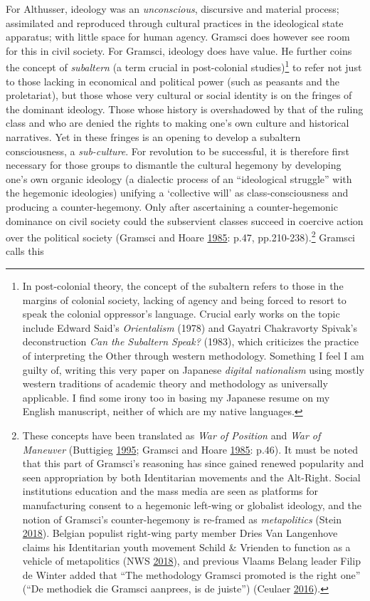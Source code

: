 \documentclass[10pt,british,A4paper,,openany]{memoir}
\begin{document}
For Althusser, ideology was an \emph{unconscious}, discursive and
material process; assimilated and reproduced through cultural practices
in the ideological state apparatus; with little space for human agency.
Gramsci does however see room for this in civil society. For Gramsci,
ideology does have value. He further coins the concept of
\emph{subaltern} (a term crucial in post-colonial studies)\footnote{In
  post-colonial theory, the concept of the subaltern refers to those in
  the margins of colonial society, lacking of agency and being forced to
  resort to speak the colonial oppressor's language. Crucial early works
  on the topic include Edward Said's \emph{Orientalism} (1978) and
  Gayatri Chakravorty Spivak's deconstruction \emph{Can the Subaltern
  Speak?} (1983), which criticizes the practice of interpreting the
  Other through western methodology. Something I feel I am guilty of,
  writing this very paper on Japanese \emph{digital nationalism} using
  mostly western traditions of academic theory and methodology as
  universally applicable. I find some irony too in basing my Japanese
  resume on my English manuscript, neither of which are my native
  languages.} to refer not just to those lacking in economical and
political power (such as peasants and the proletariat), but those whose
very cultural or social identity is on the fringes of the dominant
ideology. Those whose history is overshadowed by that of the ruling
class and who are denied the rights to making one's own culture and
historical narratives. Yet in these fringes is an opening to develop a
subaltern consciousness, a \emph{sub-culture}. For revolution to be
successful, it is therefore first necessary for those groups to
dismantle the cultural hegemony by developing one's own organic ideology
(a dialectic process of an ``ideological struggle'' with the hegemonic
ideologies) unifying a `collective will' as class-consciousness and
producing a counter-hegemony. Only after ascertaining a
counter-hegemonic dominance on civil society could the subservient
classes succeed in coercive action over the political society (Gramsci
and Hoare \protect\hyperlink{ref-gramsci_selections_1985}{1985}: p.47,
pp.210-238).\footnote{These concepts have been translated as \emph{War
  of Position} and \emph{War of Maneuver} (Buttigieg
  \protect\hyperlink{ref-buttigieg_gramsci_1995}{1995}; Gramsci and
  Hoare \protect\hyperlink{ref-gramsci_selections_1985}{1985}: p.46). It
  must be noted that this part of Gramsci's reasoning has since gained
  renewed popularity and seen appropriation by both Identitarian
  movements and the Alt-Right. Social institutions education and the
  mass media are seen as platforms for manufacturing consent to a
  hegemonic left-wing or globalist ideology, and the notion of Gramsci's
  counter-hegemony is re-framed as \emph{metapolitics} (Stein
  \protect\hyperlink{ref-stein_jeff_2018}{2018}). Belgian populist
  right-wing party member Dries Van Langenhove claims his Identitarian
  youth movement Schild \& Vrienden to function as a vehicle of
  metapolitics (NWS \protect\hyperlink{ref-nws_van_2018}{2018}), and
  previous Vlaams Belang leader Filip de Winter added that ``The
  methodology Gramsci promoted is the right one'' (``De methodiek die
  Gramsci aanprees, is de juiste'') (Ceulaer
  \protect\hyperlink{ref-ceulaer_6_2016}{2016}).} Gramsci calls this
\end{document}
